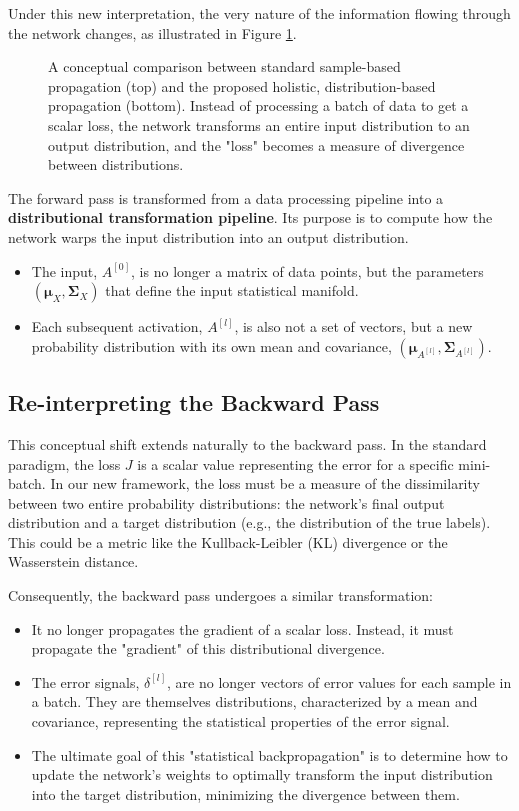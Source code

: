 Under this new interpretation, the very nature of the information flowing through the network changes, as illustrated in Figure \ref{fig:stat_prop_diagram}.

\begin{figure}[h!]
    \centering
    \scalebox{0.6}{\statisticalpropagationdiagram}
    \caption{A conceptual comparison between standard sample-based propagation (top) and the proposed holistic, distribution-based propagation (bottom). Instead of processing a batch of data to get a scalar loss, the network transforms an entire input distribution to an output distribution, and the "loss" becomes a measure of divergence between distributions.}
    \label{fig:stat_prop_diagram}
\end{figure}

The forward pass is transformed from a data processing pipeline into a \textbf{distributional transformation pipeline}. Its purpose is to compute how the network warps the input distribution into an output distribution.
\begin{itemize}
    \item The input, $A^{[0]}$, is no longer a matrix of data points, but the parameters $(\boldsymbol{\mu}_X, \boldsymbol{\Sigma}_X)$ that define the input statistical manifold.
    \item Each subsequent activation, $A^{[l]}$, is also not a set of vectors, but a new probability distribution with its own mean and covariance, $(\boldsymbol{\mu}_{A^{[l]}}, \boldsymbol{\Sigma}_{A^{[l]}})$.
\end{itemize}

\subsection{Re-interpreting the Backward Pass}
This conceptual shift extends naturally to the backward pass. In the standard paradigm, the loss $J$ is a scalar value representing the error for a specific mini-batch. In our new framework, the loss must be a measure of the dissimilarity between two entire probability distributions: the network's final output distribution and a target distribution (e.g., the distribution of the true labels). This could be a metric like the Kullback-Leibler (KL) divergence or the Wasserstein distance.

Consequently, the backward pass undergoes a similar transformation:
\begin{itemize}
    \item It no longer propagates the gradient of a scalar loss. Instead, it must propagate the "gradient" of this distributional divergence.
    \item The error signals, $\delta^{[l]}$, are no longer vectors of error values for each sample in a batch. They are themselves distributions, characterized by a mean and covariance, representing the statistical properties of the error signal.
    \item The ultimate goal of this "statistical backpropagation" is to determine how to update the network's weights to optimally transform the input distribution into the target distribution, minimizing the divergence between them.
\end{itemize}


